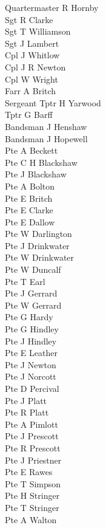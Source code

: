 \begin{multicols}{2}
  Quartermaster R Hornby \\
  Sgt R Clarke \\
  Sgt T Williamson \\
  Sgt J Lambert \\
  Cpl J Whitlow \\
  Cpl J R Newton \\
  Cpl W Wright \\
  Farr A Britch \\
  Sergeant Tptr H Yarwood \\
  Tptr G Barff \\
  Bandsman J Henshaw \\
  Bandsman J Hopewell \\
  Pte A Beckett \\
  Pte C H Blackshaw \\
  Pte J Blackshaw \\
  Pte A Bolton \\
  Pte E Britch \\
  Pte E Clarke \\
  Pte E Dallow \\
  Pte W Darlington \\
  Pte J Drinkwater \\
  Pte W Drinkwater \\
  Pte W Duncalf \\
  Pte T Earl \\
  Pte J Gerrard \\
  Pte W Gerrard \\
  Pte G Hardy \\
  Pte G Hindley \\
  Pte J Hindley \\
  Pte E Leather \\
  Pte J Newton \\
  Pte J Norcott \\
  Pte D Percival \\
  Pte J Platt \\
  Pte R Platt \\
  Pte A Pimlott \\
  Pte J Prescott \\
  Pte R Prescott \\
  Pte J Priestner \\
  Pte E Rawes \\
  Pte T Simpson \\
  Pte H Stringer \\
  Pte T Stringer \\
  Pte A Walton \\

\end{multicols}
